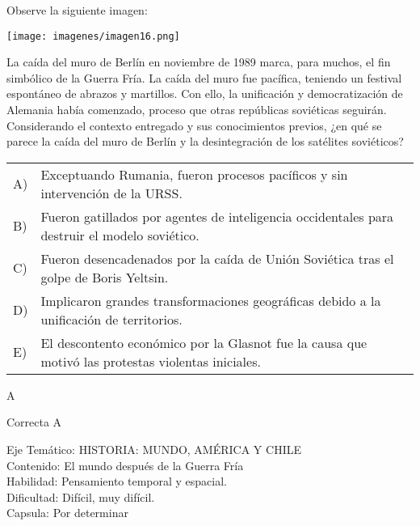 \documentclass[letterpaper,11pt]{article}
\newcommand{\anchopregunta}{0.9\textwidth}
\begin{document}
\begin{enumerate}
\begin{minipage}{\anchopregunta}
\item Observe la siguiente imagen:
\begin{center}
    \texttt{[image: imagenes/imagen16.png]}
\end{center}
La caída del muro de Berlín en noviembre de 1989 marca, para muchos, el fin simbólico de la Guerra Fría. La caída del muro fue pacífica, teniendo un festival espontáneo de abrazos y martillos. Con ello, la unificación y democratización de Alemania había comenzado, proceso que otras repúblicas soviéticas seguirán. Considerando el contexto entregado y sus conocimientos previos, ¿en qué se parece la caída del muro de Berlín y la desintegración de los satélites soviéticos?
\begin{flushleft}\begin{tabular}{@{\hspace{-.001\textwidth}}l@{\hspace{2pt}}p{}}
A)& Exceptuando Rumania, fueron procesos pacíficos y sin intervención de la URSS.\\
B)& Fueron gatillados por agentes de inteligencia occidentales para destruir el modelo soviético.\\
C)& Fueron desencadenados por la caída de Unión Soviética tras el golpe de Boris Yeltsin.\\
D)& Implicaron grandes transformaciones geográficas debido a la unificación de territorios.\\
E)& El descontento económico por la Glasnot fue la causa que motivó las protestas violentas iniciales.\\ 
\end{tabular}\end{flushleft}%
\begin{key} A
\end{key} 
\begin{hint}
\end{hint}
\begin{answer} Correcta A \\
\end{answer}
\begin{info} %
\begin{flushleft}
Eje Temático: HISTORIA: MUNDO, AMÉRICA Y CHILE\\
Contenido: El mundo después de la Guerra Fría\\
Habilidad: Pensamiento temporal y espacial.\\
Dificultad: Difícil, muy difícil.\\
Capsula: Por determinar \\
\end{flushleft} 
\end{info}
\end{minipage}\vfill$\;$ %


\end{enumerate}
\end{document}
